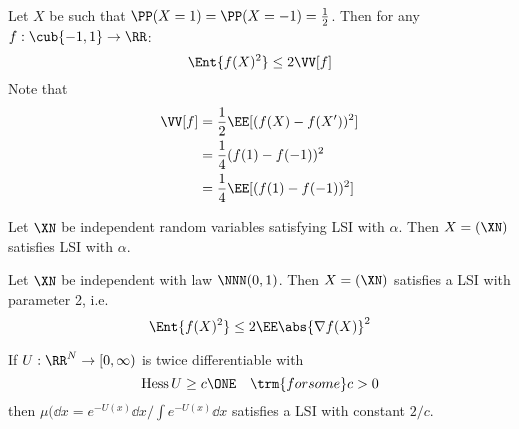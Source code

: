 \begin{exm}
    Let $X$ be such that $\PP(X=1)= \PP(X=-1)=\frac{1}{2}$. Then for any $f:\cub{-1,1}\to \RR$: 
    $$\Ent{f(X)^2} \leq 2\VV[f]$$
    Note that 
    \begin{align*}
        \VV[f] &= \frac{1}{2}\EE[(f(X)-f(X'))^2] \\
        &= \frac{1}{4}(f(1)-f(-1))^2 \\
        &= \frac{1}{4}\EE[(f(1)-f(-1))^2]
    \end{align*}
\end{exm}


\begin{thm}
    Let $\XN$ be independent random variables satisfying LSI with $\alpha$. Then $X=(\XN)$ satisfies LSI with $\alpha$.
\end{thm}


\begin{thm}
    Let $\XN$ be independent with law $\NNN(0,1)$. Then $X=(\XN)$ satisfies a LSI with parameter 2, i.e. 
    $$\Ent{f(X)^2} \leq 2 \EE \abs{\nabla f(X)}^2$$
\end{thm}


\begin{remark}
    If $U:\RR^N \to [0,\infty)$ is twice differentiable with $$\operatorname{Hess }U \geq c\ONE \quad \trm{for some }c>0$$
    then $\mu(\dd{x}=e^{-U(x)}\dd{x} / \int e^{-U(x)}\dd{x}$ satisfies a LSI with constant $2/c$.
\end{remark}